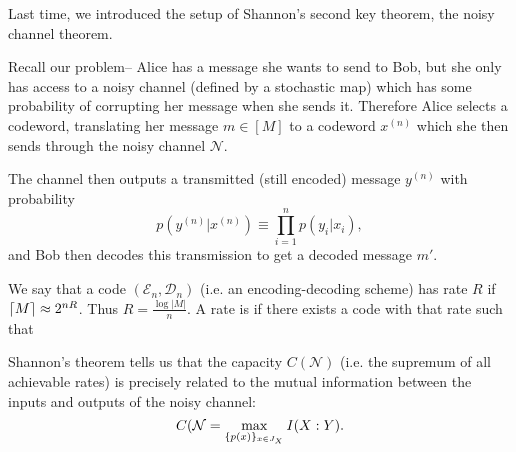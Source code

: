 Last time, we introduced the setup of Shannon's second key theorem, the noisy channel theorem.

Recall our problem-- Alice has a message she wants to send to Bob, but she only has access to a noisy channel (defined by a stochastic map) which has some probability of corrupting her message when she sends it. Therefore Alice selects a codeword, translating her message $m\in [M]$ to a codeword $x^{(n)}$ which she then sends through the noisy channel $\mathcal{N}$.

The channel then outputs a transmitted (still encoded) message $y^{(n)}$ with probability
\begin{equation}
    p(y^{(n)}|x^{(n)}) \equiv \prod_{i=1}^n p(y_i| x_i),
\end{equation}
and Bob then decodes this transmission to get a decoded message $m'$.

We say that a code $(\mathcal{E}_n,\mathcal{D}_n)$ (i.e. an encoding-decoding scheme) has rate $R$ if $\lceil M\rceil\approx 2^{nR}$. Thus $R =\frac{\log |M|}{n}$. A rate is  if there exists a code with that rate such that 

Shannon's theorem tells us that the capacity $C(\mathcal{N})$ (i.e. the supremum of all achievable rates) is precisely related to the mutual information between the inputs and outputs of the noisy channel:
\begin{equation}
    C(\mathcal{N}=\max_{\{p(x)\}_{x\in J_X}} I(X: Y).
\end{equation}

